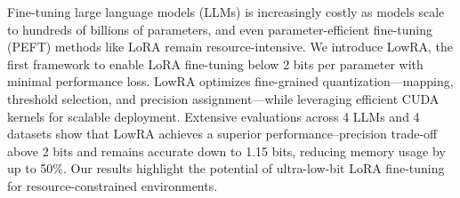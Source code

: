 
Fine-tuning large language models (LLMs) is increasingly costly as models scale to hundreds of billions of parameters, and even parameter-efficient fine-tuning (PEFT) methods like LoRA remain resource-intensive. 
We introduce LowRA, the first framework to enable LoRA fine-tuning below 2 bits per parameter with minimal performance loss. 
LowRA optimizes fine-grained quantization—mapping, threshold selection, and precision assignment—while leveraging efficient CUDA kernels for scalable deployment. 
Extensive evaluations across 4 LLMs and 4 datasets show that LowRA achieves a superior performance–precision trade-off above 2 bits and remains accurate down to 1.15 bits, reducing memory usage by up to 50\%. 
Our results highlight the potential of ultra-low-bit LoRA fine-tuning for resource-constrained environments. 
